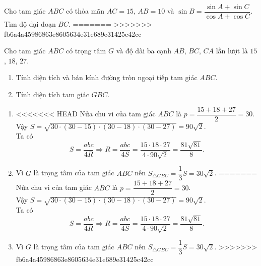\begin{ex}%
Cho tam giác $ABC$ có thỏa mãn $AC=15$, $AB=10$ và $\sin B=\dfrac{\sin A+\sin C}{\cos A+\cos C}$. Tìm độ dại đoạn $BC$.
=======
>>>>>>> fb6a4a45986863e8605634e31e689e31425c42cc
\end{ex}
\begin{ex}
	Cho tam giác $ABC$ có trọng tâm $G$ và độ dài ba cạnh $AB$, $BC$, $CA$ lần lượt là $15$, $18$, $27$.
	\begin{enumerate}
		\item Tính diện tích và bán kính đường tròn ngoại tiếp tam giác $ABC$.
		\item Tính diện tích tam giác $GBC$.
	\end{enumerate}
	\loigiai
	{
		\begin{enumerate}
			\item %
<<<<<<< HEAD
			 Nửa chu vi của tam giác $ABC$ là $p=\dfrac{15+18+27}{2}=30$.\\
			 Vậy $S=\sqrt{30\cdot (30-15)\cdot (30-18)\cdot (30-27)}=90\sqrt{2}$.\\
			 Ta có
			 $$S=\dfrac{abc}{4R}\Rightarrow R=\dfrac{abc}{4S}=\dfrac{15\cdot 18 \cdot 27}{4 \cdot 90\sqrt{2}}=\dfrac{81\sqrt{81}}{8}.$$
			\item %
			 Vì $G$ là trọng tâm của tam giác $ABC$ nên $S_{\triangle GBC}=\dfrac{1}{3}S=30\sqrt{2}$.
=======
			      Nửa chu vi của tam giác $ABC$ là $p=\dfrac{15+18+27}{2}=30$.\\
			      Vậy $S=\sqrt{30\cdot (30-15)\cdot (30-18)\cdot (30-27)}=90\sqrt{2}$.\\
			      Ta có
			      $$S=\dfrac{abc}{4R}\Rightarrow R=\dfrac{abc}{4S}=\dfrac{15\cdot 18 \cdot 27}{4 \cdot 90\sqrt{2}}=\dfrac{81\sqrt{81}}{8}.$$
			\item %
			      Vì $G$ là trọng tâm của tam giác $ABC$ nên $S_{\triangle GBC}=\dfrac{1}{3}S=30\sqrt{2}$.
>>>>>>> fb6a4a45986863e8605634e31e689e31425c42cc
		\end{enumerate}
	}
\end{ex}

